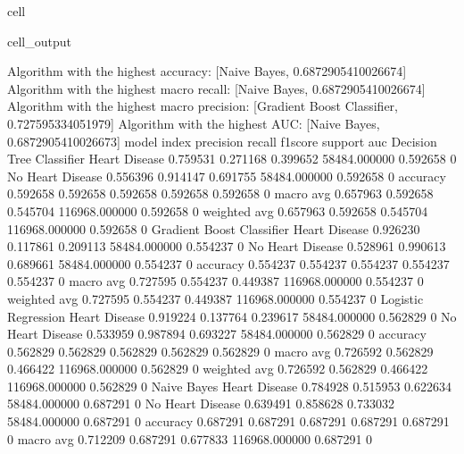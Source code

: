 \documentclass[letterpaper,10pt,english]{jupyterBook}
\begin{document}
\begin{sphinxuseclass}{cell}
\begin{sphinxVerbatimOutput}
\begin{sphinxuseclass}{cell_output}
\begin{sphinxVerbatim}[commandchars=\\\{\}]
Algorithm with the highest accuracy: [\PYGZsq{}Naive Bayes\PYGZsq{}, 0.6872905410026674]
Algorithm with the highest macro recall:
        [\PYGZsq{}Naive Bayes\PYGZsq{}, 0.6872905410026674]
Algorithm with the highest macro precision:
        [\PYGZsq{}Gradient Boost Classifier\PYGZsq{}, 0.727595334051979]
Algorithm with the highest AUC:
        [\PYGZsq{}Naive Bayes\PYGZsq{}, 0.6872905410026673]
model                      index             precision  recall    f1\PYGZhy{}score  support        auc     
Decision Tree Classifier   Heart Disease     0.759531   0.271168  0.399652  58484.000000   0.592658    0
                           No Heart Disease  0.556396   0.914147  0.691755  58484.000000   0.592658    0
                           accuracy          0.592658   0.592658  0.592658  0.592658       0.592658    0
                           macro avg         0.657963   0.592658  0.545704  116968.000000  0.592658    0
                           weighted avg      0.657963   0.592658  0.545704  116968.000000  0.592658    0
Gradient Boost Classifier  Heart Disease     0.926230   0.117861  0.209113  58484.000000   0.554237    0
                           No Heart Disease  0.528961   0.990613  0.689661  58484.000000   0.554237    0
                           accuracy          0.554237   0.554237  0.554237  0.554237       0.554237    0
                           macro avg         0.727595   0.554237  0.449387  116968.000000  0.554237    0
                           weighted avg      0.727595   0.554237  0.449387  116968.000000  0.554237    0
Logistic Regression        Heart Disease     0.919224   0.137764  0.239617  58484.000000   0.562829    0
                           No Heart Disease  0.533959   0.987894  0.693227  58484.000000   0.562829    0
                           accuracy          0.562829   0.562829  0.562829  0.562829       0.562829    0
                           macro avg         0.726592   0.562829  0.466422  116968.000000  0.562829    0
                           weighted avg      0.726592   0.562829  0.466422  116968.000000  0.562829    0
Naive Bayes                Heart Disease     0.784928   0.515953  0.622634  58484.000000   0.687291    0
                           No Heart Disease  0.639491   0.858628  0.733032  58484.000000   0.687291    0
                           accuracy          0.687291   0.687291  0.687291  0.687291       0.687291    0
                           macro avg         0.712209   0.687291  0.677833  116968.000000  0.687291    0

\end{sphinxVerbatim}
\end{sphinxuseclass}
\end{sphinxVerbatimOutput}
\end{sphinxuseclass}
\end{document}
